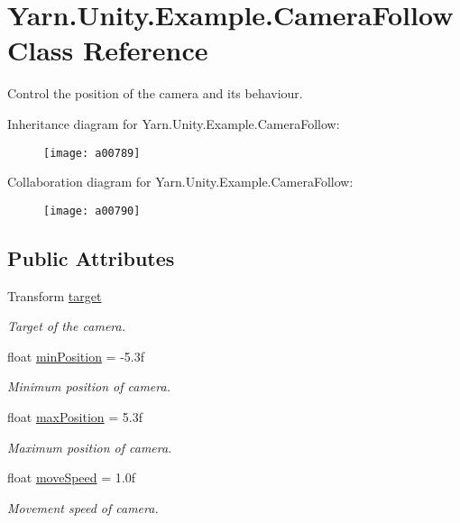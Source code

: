 \hypertarget{a00041}{\section{Yarn.\-Unity.\-Example.\-Camera\-Follow Class Reference}
\label{a00041}
}


Control the position of the camera and its behaviour.  




Inheritance diagram for Yarn.\-Unity.\-Example.\-Camera\-Follow\-:
\nopagebreak
\begin{figure}[H]
\begin{center}
\leavevmode
\texttt{[image: a00789]}
\end{center}
\end{figure}


Collaboration diagram for Yarn.\-Unity.\-Example.\-Camera\-Follow\-:
\nopagebreak
\begin{figure}[H]
\begin{center}
\leavevmode
\texttt{[image: a00790]}
\end{center}
\end{figure}
\subsection*{Public Attributes}
\begin{DoxyCompactItemize}
\item 
Transform \hyperlink{a00041_aa5d6958fb14a14ebb74e21c372fcca8b}{target}
\begin{DoxyCompactList}\small\item\em Target of the camera. \end{DoxyCompactList}\item 
float \hyperlink{a00041_a08c6f6c0ea423c21af99e4b5467d3c9b}{min\-Position} = -\/5.\-3f
\begin{DoxyCompactList}\small\item\em Minimum position of camera. \end{DoxyCompactList}\item 
float \hyperlink{a00041_abb0154dcbc2a7d43795beacd61a56de4}{max\-Position} = 5.\-3f
\begin{DoxyCompactList}\small\item\em Maximum position of camera. \end{DoxyCompactList}\item 
float \hyperlink{a00041_a3d4f2efe9c2cee8c7ff797cac03f27ec}{move\-Speed} = 1.\-0f
\begin{DoxyCompactList}\small\item\em Movement speed of camera. \end{DoxyCompactList}\end{DoxyCompactItemize}
